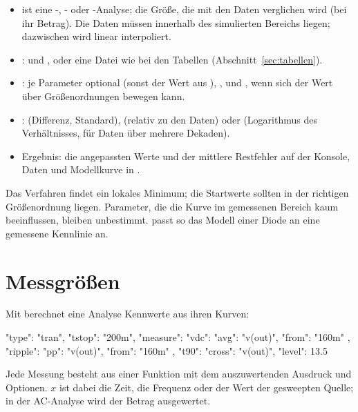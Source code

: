 \begin{itemize}
  \item {} ist eine -, - oder
    -Analyse;  die Größe, die mit den Daten
    verglichen wird (bei  ihr Betrag). Die Daten müssen innerhalb
    des simulierten Bereichs liegen; dazwischen wird linear interpoliert.
  \item {}:  und ,  oder eine Datei
    wie bei den Tabellen (Abschnitt~\ref{sec:tabellen}).
  \item {}: je Parameter optional  (sonst der
    Wert aus ), ,  und
    , wenn sich der Wert über Größenordnungen bewegen
    kann.
  \item {}:  (Differenz, Standard), 
    (relativ zu den Daten) oder  (Logarithmus des Verhältnisses,
    für Daten über mehrere Dekaden).
  \item Ergebnis: die angepassten Werte und der mittlere Restfehler auf der
    Konsole, Daten und Modellkurve in .
\end{itemize}

Das Verfahren findet ein lokales Minimum; die Startwerte sollten in der
richtigen Größenordnung liegen. Parameter, die die Kurve im gemessenen
Bereich kaum beeinflussen, bleiben unbestimmt.
 passt so das Modell einer Diode an eine
gemessene Kennlinie an.

\section{Messgrößen}
\label{sec:messgroessen}

Mit  berechnet eine Analyse Kennwerte aus ihren Kurven:

\begin{json}
{ "type": "tran", "tstop": "200m",
  "measure": {
    "vdc":    { "avg": "v(out)", "from": "160m" },
    "ripple": { "pp":  "v(out)", "from": "160m" },
    "t90":    { "cross": "v(out)", "level": 13.5 }
  } }
\end{json}

Jede Messung besteht aus einer Funktion mit dem auszuwertenden Ausdruck und
Optionen. $x$ ist dabei die Zeit, die Frequenz oder der Wert der gesweepten
Quelle; in der AC-Analyse wird der Betrag ausgewertet.

